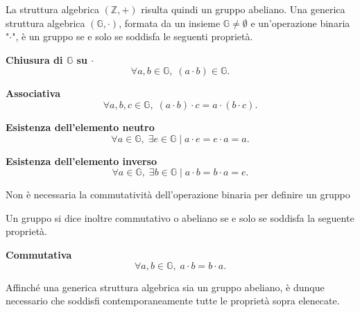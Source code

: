 La struttura algebrica $(\mathbb{Z}, +)$ risulta quindi un gruppo abeliano.
Una generica struttura algebrica $(\mathbb{G}, \cdot)$, formata da un insieme
$\mathbb{G} \neq \emptyset$ e un'operazione binaria "$\cdot$", è un gruppo se e solo se
soddisfa le seguenti proprietà.

\begin{property}
    \textbf{Chiusura di $\mathbb{G}$ su $\cdot$}
    \[\forall a, b \in \mathbb{G}, \; (a \cdot b) \in \mathbb{G}.\]
\end{property}
\begin{property}
    \textbf{Associativa}
    \[\forall a, b, c \in \mathbb{G}, \; (a \cdot b) \cdot c = a \cdot (b \cdot c).\]
\end{property}
\begin{property}
    \textbf{Esistenza dell'elemento neutro}
    \[\forall a \in \mathbb{G}, \; \exists e \in \mathbb{G} \mid a \cdot e = e \cdot a = a.\]
\end{property}
\begin{property}
    \textbf{Esistenza dell'elemento inverso}
    \[\forall a \in \mathbb{G}, \; \exists b \in \mathbb{G} \mid a \cdot b = b \cdot a = e.\]
\end{property}

\begin{observation}
    Non è necessaria la commutatività dell'operazione binaria per definire un gruppo
\end{observation}

Un gruppo si dice inoltre commutativo o abeliano se e solo se soddisfa la seguente proprietà.
\begin{property}
    \textbf{Commutativa}
    \[\forall a, b \in \mathbb{G}, \; a \cdot b = b \cdot a.\]
\end{property}

Affinché una generica struttura algebrica sia un gruppo abeliano,
è dunque necessario che soddisfi contemporaneamente tutte le proprietà sopra elenecate.
